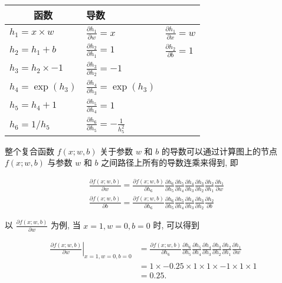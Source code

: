 \documentclass[10pt]{article}
\begin{document}
\begin{center}
\begin{tabular}{lll}
\hline
\multicolumn{1}{c}{函数} & 导数 &  \\
\hline
$h_{1}=x \times w$ & $\frac{\partial h_{1}}{\partial w}=x$ & $\frac{\partial h_{1}}{\partial x}=w$ \\
$h_{2}=h_{1}+b$ & $\frac{\partial h_{2}}{\partial h_{1}}=1$ & $\frac{\partial h_{2}}{\partial b}=1$ \\
$h_{3}=h_{2} \times-1$ & $\frac{\partial h_{3}}{\partial h_{2}}=-1$ &  \\
$h_{4}=\exp \left(h_{3}\right)$ & $\frac{\partial h_{4}}{\partial h_{3}}=\exp \left(h_{3}\right)$ &  \\
$h_{5}=h_{4}+1$ & $\frac{\partial h_{5}}{\partial h_{4}}=1$ &  \\
$h_{6}=1 / h_{5}$ & $\frac{\partial h_{6}}{\partial h_{5}}=-\frac{1}{h_{5}^{2}}$ &  \\
\hline
\end{tabular}
\end{center}

整个复合函数 $f(x ; w, b)$ 关于参数 $w$ 和 $b$ 的导数可以通过计算图上的节点 $f(x ; w, b)$ 与参数 $w$ 和 $b$ 之间路径上所有的导数连乘来得到, 即


\begin{align*}
& \frac{\partial f(x ; w, b)}{\partial w}=\frac{\partial f(x ; w, b)}{\partial h_{6}} \frac{\partial h_{6}}{\partial h_{5}} \frac{\partial h_{5}}{\partial h_{4}} \frac{\partial h_{4}}{\partial h_{3}} \frac{\partial h_{3}}{\partial h_{2}} \frac{\partial h_{2}}{\partial h_{1}} \frac{\partial h_{1}}{\partial w}  \tag{4.75}\\
& \frac{\partial f(x ; w, b)}{\partial b}=\frac{\partial f(x ; w, b)}{\partial h_{6}} \frac{\partial h_{6}}{\partial h_{5}} \frac{\partial h_{5}}{\partial h_{4}} \frac{\partial h_{4}}{\partial h_{3}} \frac{\partial h_{3}}{\partial h_{2}} \frac{\partial h_{2}}{\partial b} \tag{4.76}
\end{align*}


以 $\frac{\partial f(x ; w, b)}{\partial w}$ 为例, 当 $x=1, w=0, b=0$ 时, 可以得到


\begin{align*}
\left.\frac{\partial f(x ; w, b)}{\partial w}\right|_{x=1, w=0, b=0} & =\frac{\partial f(x ; w, b)}{\partial h_{6}} \frac{\partial h_{6}}{\partial h_{5}} \frac{\partial h_{5}}{\partial h_{4}} \frac{\partial h_{4}}{\partial h_{3}} \frac{\partial h_{3}}{\partial h_{2}} \frac{\partial h_{2}}{\partial h_{1}} \frac{\partial h_{1}}{\partial w}  \tag{4.77}\\
& =1 \times-0.25 \times 1 \times 1 \times-1 \times 1 \times 1  \tag{4.78}\\
& =0.25 . \tag{4.79}
\end{align*}
\end{document}
